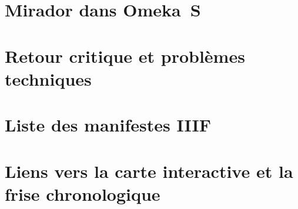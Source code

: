 \documentclass[a4paper,12pt,twoside]{book}
\begin{document}
	\chapter[Mirador dans Omeka ~S]{Mirador dans Omeka~S}
	
	\chapter[Retour critique]{Retour critique et problèmes techniques}
	
	\chapter[Liste des manifestes IIIF]{Liste des manifestes IIIF}
	
	\chapter[Liens des projets]{Liens vers la carte interactive et la frise chronologique}
	
	\newpage{\pagestyle{empty}\cleardoublepage}
	
	\backmatter
	
	\printindex
	\listoffigures
	\tableofcontents
\end{document}
